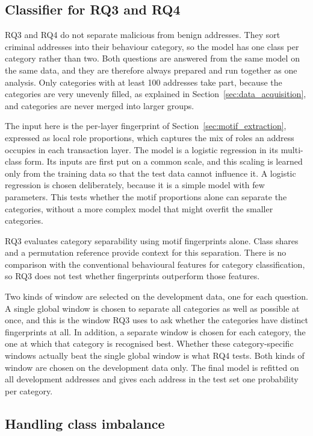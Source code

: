 \subsection{Classifier for RQ3 and RQ4}

RQ3 and RQ4 do not separate malicious from benign addresses. They sort criminal
addresses into their behaviour category, so the model has one class per category
rather than two. Both questions are answered from the same model on the same
data, and they are therefore always prepared and run together as one analysis.
Only categories with at least 100 addresses take part, because the categories are
very unevenly filled, as explained in Section~\ref{sec:data_acquisition}, and
categories are never merged into larger groups.

The input here is the per-layer fingerprint of
Section~\ref{sec:motif_extraction}, expressed as local role proportions, which captures
the mix of roles an address occupies in each transaction layer. The model is a
logistic regression in its multi-class form. Its inputs are first put on a common
scale, and this scaling is learned only from the training data so that the test
data cannot influence it. A logistic regression is chosen deliberately, because it
is a simple model with few parameters. This tests whether the motif proportions
alone can separate the categories, without a more complex model that might overfit
the smaller categories.

RQ3 evaluates category separability using motif fingerprints alone. Class
shares and a permutation reference provide context for this separation.
There is no comparison with the conventional behavioural features for category
classification, so RQ3 does not test whether fingerprints outperform those
features.

Two kinds of window are selected on the development data, one for each question. A
single global window is chosen to separate all categories as well as possible at
once, and this is the window RQ3 uses to ask whether the categories have distinct
fingerprints at all. In addition, a separate window is chosen for each category,
the one at which that category is recognised best. Whether these category-specific
windows actually beat the single global window is what RQ4 tests. Both kinds of
window are chosen on the development data only. The final model is refitted on all
development addresses and gives each address in the test set one probability per
category.

\subsection{Handling class imbalance}

